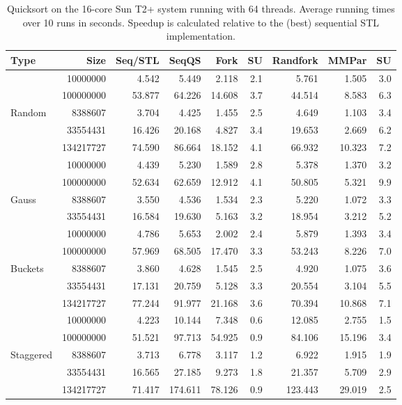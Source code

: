 \documentclass[preprint]{sigplanconf}
\begin{document}
\begin{table*}[t!]
\begin{center}
\begin{tabular}{|lr|rr|rrr||rr|}
\hline
Type & Size & Seq/STL & SeqQS & Fork & SU & Randfork & MMPar & SU \\
\hline
 & 10000000 & 4.542 & 5.449 & 2.118 & 2.1 & 5.761 & 1.505 & 3.0 \\
 & 100000000 & 53.877 & 64.226 & 14.608 & 3.7 & 44.514 & 8.583 & 6.3 \\
Random & 8388607 & 3.704 & 4.425 & 1.455 & 2.5 & 4.649 & 1.103 & 3.4 \\
 & 33554431 & 16.426 & 20.168 & 4.827 & 3.4 & 19.653 & 2.669 & 6.2 \\
 & 134217727 & 74.590 & 86.664 & 18.152 & 4.1 & 66.932 & 10.323 & 7.2 \\
\hline
 & 10000000 & 4.439 & 5.230 & 1.589 & 2.8 & 5.378 & 1.370 & 3.2 \\
 & 100000000 & 52.634 & 62.659 & 12.912 & 4.1 & 50.805 & 5.321 & 9.9 \\
Gauss & 8388607 & 3.550 & 4.536 & 1.534 & 2.3 & 5.220 & 1.072 & 3.3 \\
 & 33554431 & 16.584 & 19.630 & 5.163 & 3.2 & 18.954 & 3.212 & 5.2 \\
\hline
 & 10000000 & 4.786 & 5.653 & 2.002 & 2.4 & 5.879 & 1.393 & 3.4 \\
 & 100000000 & 57.969 & 68.505 & 17.470 & 3.3 & 53.243 & 8.226 & 7.0 \\
Buckets & 8388607 & 3.860 & 4.628 & 1.545 & 2.5 & 4.920 & 1.075 & 3.6 \\
 & 33554431 & 17.131 & 20.759 & 5.128 & 3.3 & 20.554 & 3.104 & 5.5 \\
 & 134217727 & 77.244 & 91.977 & 21.168 & 3.6 & 70.394 & 10.868 & 7.1 \\
\hline
 & 10000000 & 4.223 & 10.144 & 7.348 & 0.6 & 12.085 & 2.755 & 1.5 \\
 & 100000000 & 51.521 & 97.713 & 54.925 & 0.9 & 84.106 & 15.196 & 3.4 \\
Staggered & 8388607 & 3.713 & 6.778 & 3.117 & 1.2 & 6.922 & 1.915 & 1.9 \\
 & 33554431 & 16.565 & 27.185 & 9.273 & 1.8 & 21.357 & 5.709 & 2.9 \\
 & 134217727 & 71.417 & 174.611 & 78.126 & 0.9 & 123.443 & 29.019 & 2.5 \\
\hline
\end{tabular}
\end{center}
\caption{Quicksort on the 16-core Sun T2+ system running with 64 threads. 
Average running times over 10 runs in seconds.
Speedup is calculated relative to the (best) sequential STL implementation.}
\label{tab:sort_t2_64_avg}
\end{table*}
\end{document}
